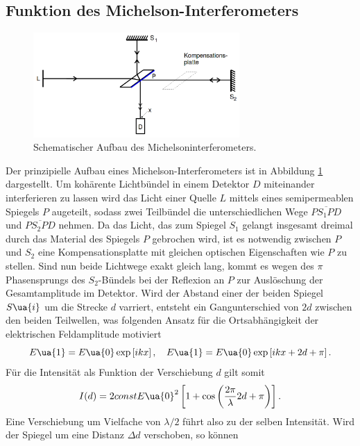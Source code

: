 \subsection{Funktion des Michelson-Interferometers}
\begin{figure}
  \centering
  \includegraphics[width = 0.7\textwidth]{table/michelson.png}
  \caption{Schematischer Aufbau des Michelsoninterferometers\cite{anleitung401}.}
  \label{fig: michelson}
\end{figure}
Der prinzipielle Aufbau eines Michelson-Interferometers ist in Abbildung \ref{fig: michelson} dargestellt. Um kohärente Lichtbündel in einem Detektor $D$ miteinander
interferieren zu lassen wird das Licht einer Quelle $L$ mittels eines semipermeablen Spiegels $P$ augeteilt, sodass zwei Teilbündel die unterschiedlichen
Wege $\overline{PS_1PD}$ und $\overline{PS_2PD}$ nehmen. Da das Licht, das zum Spiegel $S_1$ gelangt insgesamt dreimal durch das Material des Spiegels $P$ gebrochen
wird, ist es notwendig zwischen $P$ und $S_2$ eine Kompensationsplatte mit gleichen optischen Eigenschaften wie $P$ zu stellen. Sind nun beide
Lichtwege exakt gleich lang, kommt es wegen des $\pi$ Phasensprungs des $S_2$-Bündels bei der Reflexion an $P$ zur Auslöschung der Gesamtamplitude im Detektor.
Wird der Abstand einer der beiden Spiegel $S\ua{i}$ um die Strecke $d$ varriert, entsteht ein Gangunterschied von $2d$ zwischen den beiden Teilwellen, was
folgenden Ansatz für die Ortsabhängigkeit der elektrischen Feldamplitude motiviert
\begin{equation}
  E\ua{1} = E\ua{0}\exp\left[ikx \right], \quad E\ua{1} = E\ua{0}\exp\left[ikx +2d + \pi \right].
\end{equation}
Für die Intensität als Funktion der Verschiebung $d$ gilt somit
\begin{equation}
  I(d) =  2const E\ua{0}^2\left[1 + \cos\left(\frac{2\pi}{\lambda}2d + \pi  \right)\right].
\end{equation}
Eine Verschiebung um Vielfache von $\lambda / 2$ führt also zu der selben Intensität. Wird der Spiegel um eine Distanz $\Delta d$ verschoben, so können
